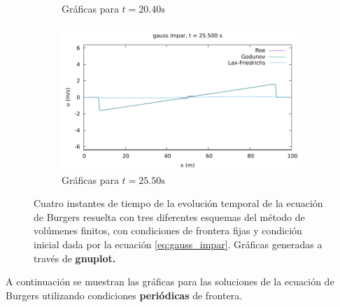 \documentclass[12pt]{article}
\begin{document}
\begin{figure}[h]
\begin{subfigure}[b]{0.49\textwidth}
			\caption*{Gráficas para $t=20.40\unit{\second}$}
			\label{fig:gauss_impar-fija3}
		\end{subfigure}
		\vfill
		\begin{subfigure}[b]{0.49\textwidth}
			\includegraphics[width=\textwidth]{../burgers1DVF/results/sol_fijas/gauss_impar/850.pdf}
			\caption*{Gráficas para $t=25.50\unit{\second}$}
			\label{fig:gauss_impar-fija4}
		\end{subfigure}
		\caption{Cuatro instantes de tiempo de la evolución temporal de la ecuación de Burgers resuelta con tres diferentes esquemas del método de volúmenes finitos, con condiciones de frontera fijas y condición inicial dada por la ecuación \ref{eq:gauss_impar}. Gráficas generadas a través de \textbf{gnuplot.}}
		\label{fig:instantes-gauss_impar-fija}
	\end{figure}
	\clearpage
	\newpage
	A continuación se muestran las gráficas para las soluciones de la ecuación de Burgers utilizando condiciones \textbf{periódicas} de frontera.
\end{document}
